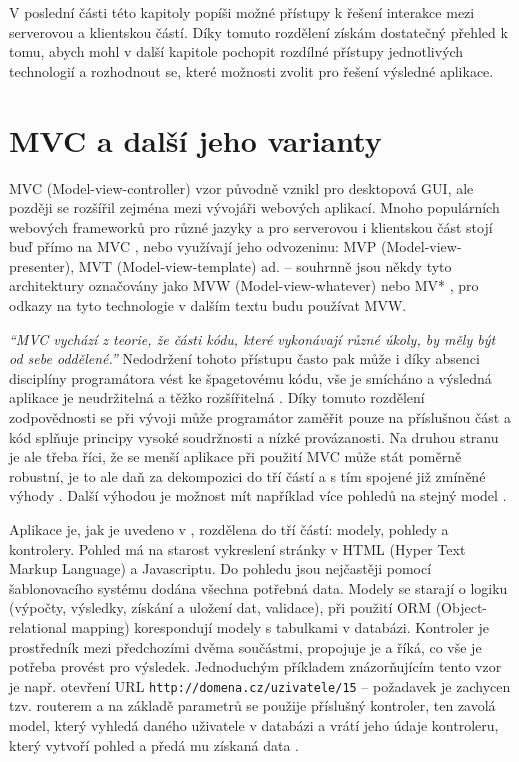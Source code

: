 V poslední části této kapitoly popíši možné přístupy k řešení interakce mezi serverovou a klientskou částí. Díky tomuto rozdělení získám dostatečný přehled k tomu, abych mohl v další kapitole pochopit rozdílné přístupy jednotlivých technologií a rozhodnout se, které možnosti zvolit pro řešení výsledné aplikace.

    \section{MVC a další jeho varianty}\label{mvc}
    MVC (Model-view-controller) vzor původně vznikl pro desktopová GUI, ale později se rozšířil zejména mezi vývojáři webových aplikací. Mnoho populárních webových frameworků pro různé jazyky a pro serverovou i klientskou část stojí buď přímo na MVC \cite{mvc-cz1}, nebo využívají jeho odvozeninu: MVP (Model-view-presenter), MVT (Model-view-template) ad. -- souhrnně jsou někdy tyto architektury označovány jako MVW (Model-view-whatever) nebo MV* \cite{mvw}, pro odkazy na tyto technologie v dalším textu budu používat MVW.
    
    \textit{\enquote{MVC vychází z teorie, že části kódu, které vykonávají různé úkoly, by měly být od sebe oddělené.}} \cite{mvc-cz2} Nedodržení tohoto přístupu často pak může i díky absenci disciplíny programátora vést ke špagetovému kódu, vše je smícháno a výsledná aplikace je neudržitelná a těžko rozšířitelná \cite{mvc-cz2}\cite{mvc-2}. Díky tomuto rozdělení zodpovědnosti se při vývoji může programátor zaměřit pouze na příslušnou část a kód splňuje principy vysoké soudržnosti a nízké provázanosti. Na druhou stranu je ale třeba říci, že se menší aplikace při použití MVC může stát poměrně robustní, je to ale daň za dekompozici do tří částí a s tím spojené již zmíněné výhody \cite{mvc-medium1}. Další výhodou je možnost mít například více pohledů na stejný model \cite{mvc-1}.
    
    Aplikace je, jak je uvedeno v \cite{mvc-cz2}, rozdělena do tří částí: modely, pohledy a kontrolery. Pohled má na starost vykreslení stránky v HTML (Hyper Text Markup Language) a Javascriptu. Do pohledu jsou nejčastěji pomocí šablonovacího systému dodána všechna potřebná data. Modely se starají o logiku (výpočty, výsledky, získání a uložení dat, validace), při použití ORM (Object-relational mapping) korespondují modely s tabulkami v databázi. Kontroler je prostředník mezi předchozími dvěma součástmi, propojuje je a říká, co vše je potřeba provést pro výsledek. Jednoduchým příkladem znázorňujícím tento vzor je např. otevření URL \verb|http://domena.cz/uzivatele/15| -- požadavek je zachycen tzv. routerem a na základě parametrů se použije příslušný kontroler, ten zavolá model, který vyhledá daného uživatele v databázi a vrátí jeho údaje kontroleru, který vytvoří pohled a předá mu získaná data \cite{mvc-cz1}.
    
